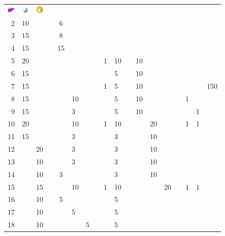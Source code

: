 \begin{table}[t]
\begin{center}
\begin{tabular}{r|g c g c g c g c g c g c g c g c g}
  \includegraphics[width=1em]{images/lure.png} &
  \includegraphics[width=1em]{images/luckyegg.png} &
  \includegraphics[width=1em]{images/pokecoin.png}
    \\
    2 & 10 &    &    &  6 &    &    &    &   &    &    &    &    &    &   &   &   & \\
    3 & 15 &    &    &  8 &    &    &    &   &    &    &    &    &    &   &   &   & \\
    4 & 15 &    &    & 15 &    &    &    &   &    &    &    &    &    &   &   &   & \\
    5 & 20 &    &    &    &    &    &    & 1 & 10 &    & 10 &    &    &   &   &   & \\
    6 & 15 &    &    &    &    &    &    &   &  5 &    & 10 &    &    &   &   &   & \\
    7 & 15 &    &    &    &    &    &    & 1 &  5 &    & 10 &    &    &   &   &   & 150 \\
    8 & 15 &    &    &    & 10 &    &    &   &  5 &    & 10 &    &    &   & 1 &   & \\
    9 & 15 &    &    &    &  3 &    &    &   &  5 &    & 10 &    &    &   &   & 1 & \\
   10 & 20 &    &    &    & 10 &    &    & 1 & 10 &    &    & 20 &    &   & 1 & 1 & \\
   11 & 15 &    &    &    &  3 &    &    &   &  3 &    &    & 10 &    &   &   &   & \\
   12 &    & 20 &    &    &  3 &    &    &   &  3 &    &    & 10 &    &   &   &   & \\
   13 &    & 10 &    &    &  3 &    &    &   &  3 &    &    & 10 &    &   &   &   & \\
   14 &    & 10 &    &  3 &    &    &    &   &  3 &    &    & 10 &    &   &   &   & \\
   15 &    & 15 &    &    & 10 &    &    & 1 & 10 &    &    &    & 20 &   & 1 & 1 & \\
   16 &    & 10 &    &  5 &    &    &    &   &  5 &    &    &    &    &   &   &   & \\
   17 &    & 10 &    &    &  5 &    &    &   &  5 &    &    &    &    &   &   &   & \\
   18 &    & 10 &    &    &    &  5 &    &   &  5 &    &    &    &    &   &   &   & \\

\end{tabular}
\end{center}
\end{table}
